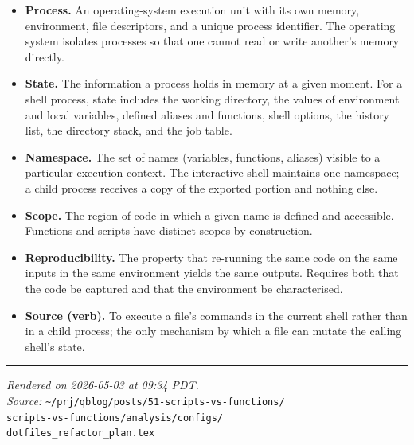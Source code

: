 \documentclass[11pt,letterpaper]{scrartcl}
\begin{document}
\begin{itemize}[leftmargin=1em,itemsep=4pt]
  \item \textbf{Process.}
    An operating-system execution unit with its own memory,
    environment, file descriptors, and a unique process
    identifier. The operating system isolates processes so that
    one cannot read or write another's memory directly.
  \item \textbf{State.}
    The information a process holds in memory at a given moment.
    For a shell process, state includes the working directory,
    the values of environment and local variables, defined
    aliases and functions, shell options, the history list, the
    directory stack, and the job table.
  \item \textbf{Namespace.}
    The set of names (variables, functions, aliases) visible to
    a particular execution context. The interactive shell
    maintains one namespace; a child process receives a copy of
    the exported portion and nothing else.
  \item \textbf{Scope.}
    The region of code in which a given name is defined and
    accessible. Functions and scripts have distinct scopes by
    construction.
  \item \textbf{Reproducibility.}
    The property that re-running the same code on the same
    inputs in the same environment yields the same outputs.
    Requires both that the code be captured and that the
    environment be characterised.
  \item \textbf{Source (verb).}
    To execute a file's commands in the current shell rather
    than in a child process; the only mechanism by which a file
    can mutate the calling shell's state.
\end{itemize}

\vfill
\hrule
\vspace{0.5em}
{\small \emph{Rendered on 2026-05-03 at 09:34 PDT.}\\
\emph{Source:}
\texttt{\textasciitilde/prj/qblog/posts/51-scripts-vs-functions/}\\
\hspace*{1.5em}\texttt{scripts-vs-functions/analysis/configs/}\\
\hspace*{1.5em}\texttt{dotfiles\_refactor\_plan.tex}}
\end{document}
